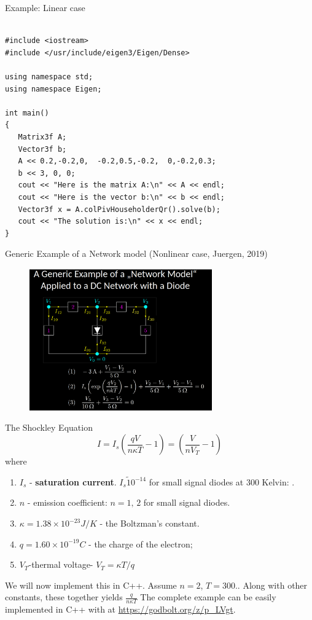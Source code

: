 \documentclass[xcolor=dvipsnames]{beamer}
\begin{document}
\begin{frame}[fragile,shrink=30]{Example: Linear case}
\begin{verbatim}

#include <iostream>
#include </usr/include/eigen3/Eigen/Dense>
 
using namespace std;
using namespace Eigen;
 
int main()
{
   Matrix3f A;
   Vector3f b;
   A << 0.2,-0.2,0,  -0.2,0.5,-0.2,  0,-0.2,0.3;
   b << 3, 0, 0;
   cout << "Here is the matrix A:\n" << A << endl;
   cout << "Here is the vector b:\n" << b << endl;
   Vector3f x = A.colPivHouseholderQr().solve(b);
   cout << "The solution is:\n" << x << endl;
}
\end{verbatim}
\end{frame}

\begin{frame}{Generic Example of a Network model (Nonlinear case, Juergen, 2019)}
     	     \begin{figure}[!ht]
  			\centering
    		\includegraphics[width=0.7\textwidth]{diode.png}
    		\label{fig:juergen2}
    	 \end{figure}
\end{frame}

\begin{frame}{The Shockley Equation}
\[I=I_s\left(\frac{qV}{n\kappa T}-1\right)=\left(\frac{V}{nV_T}-1\right)\]
where
\begin{enumerate}
    \item $I_s$ - \textbf{saturation current}. $I_s\tilde 10^{-14}$ for small signal diodes at $300$ Kelvin: .
    \item $n$ - emission coefficient: $n=1,\,2$ for small signal diodes.
    \item $\kappa=1.38\times 10^{-23} J/K$ - the Boltzman's constant.
    \item $q=1.60\times 10^{-19}C$ - the charge of the electron;
    \item $V_T$-thermal voltage- $V_T=\kappa T/q$
\end{enumerate}
We will now implement this in C++. Assume $n=2$, $T=300.$. Along with other constants, these together yields $\frac{q}{n\kappa T}$ The complete example can be easily implemented in C++ with  \href{http://eigen.tuxfamily.org/index.php?title=Main_Page}{}
at \url{https://godbolt.org/z/p_LVgt}.
\end{frame}
\end{document}
